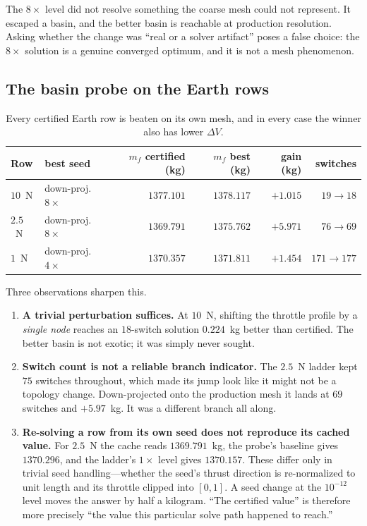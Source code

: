 \documentclass[11pt]{article}
\newcommand{\mf}{m_f}
\newcommand{\dV}{\Delta V}
\begin{document}
The $8\times$ level did not resolve something the coarse mesh could not
represent. It escaped a basin, and the better basin is reachable at production
resolution. Asking whether the change was ``real or a solver artifact'' poses a
false choice: the $8\times$ solution is a genuine converged optimum, and it is
not a mesh phenomenon.

\subsection{The basin probe on the Earth rows}

\begin{table}[h]
\centering
\small
\begin{tabular}{llrrrr}
\toprule
Row & best seed & $\mf$ certified (kg) & $\mf$ best (kg) & gain (kg) & switches \\
\midrule
$10$~N  & down-proj.\ $8\times$ & $1377.101$ & $1378.117$ & $+1.015$ & $19 \to 18$ \\
$2.5$~N & down-proj.\ $8\times$ & $1369.791$ & $1375.762$ & $+5.971$ & $76 \to 69$ \\
$1$~N   & down-proj.\ $4\times$ & $1370.357$ & $1371.811$ & $+1.454$ & $171 \to 177$ \\
\bottomrule
\end{tabular}
\caption{Every certified Earth row is beaten on its own mesh, and in every case
the winner also has lower $\dV$.}
\end{table}

Three observations sharpen this.

\begin{enumerate}
  \item \textbf{A trivial perturbation suffices.} At $10$~N, shifting the
  throttle profile by a \emph{single node} reaches an $18$-switch solution
  $0.224$~kg better than certified. The better basin is not exotic; it was
  simply never sought.
  \item \textbf{Switch count is not a reliable branch indicator.} The $2.5$~N
  ladder kept $75$ switches throughout, which made its jump look like it might
  not be a topology change. Down-projected onto the production mesh it lands at
  $69$ switches and $+5.97$~kg. It was a different branch all along.
  \item \textbf{Re-solving a row from its own seed does not reproduce its
  cached value.} For $2.5$~N the cache reads $1369.791$~kg, the probe's
  baseline gives $1370.296$, and the ladder's $1\times$ level gives $1370.157$.
  These differ only in trivial seed handling---whether the seed's thrust
  direction is re-normalized to unit length and its throttle clipped into
  $[0,1]$. A seed change at the $10^{-12}$ level moves the answer by half a
  kilogram. ``The certified value'' is therefore more precisely ``the value
  this particular solve path happened to reach.''
\end{enumerate}
\end{document}
